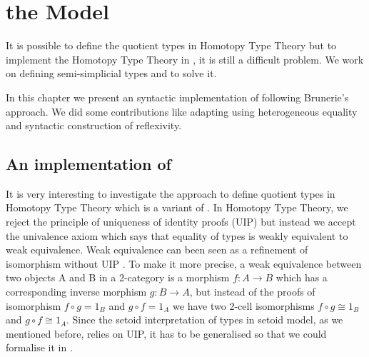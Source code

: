 \chapter{the \og Model}
\label{wog}




It is possible to
define the quotient types in Homotopy Type Theory but to implement the
Homotopy Type Theory in \itt{}, it is still a difficult problem. We
work on defining semi-simplicial types and \wog{} to solve it. 



In this chapter we present an syntactic implementation of \wog{} following
Brunerie's approach. We did some contributions like adapting using
heterogeneous equality and syntactic construction of reflexivity.



\section{An implementation of \wog{}}

It is very interesting to investigate the approach to define quotient
types in Homotopy Type Theory which is a variant of \mltt{}. In
Homotopy Type Theory, we reject
the principle of uniqueness of identity proofs (UIP) but instead we accept the univalence axiom which
says that equality of types is weakly equivalent to weak equivalence. Weak equivalence can been seen as a refinement of isomorphism without UIP \cite{txa:csl}. To make it more precise, a weak equivalence
between two objects A and B in a 2-category is a morphism $f : A \to B$ which has a
corresponding inverse morphism $ g : B \to A$, but instead of the
proofs of isomorphism $f ∘ g = 1_B$ and  $g ∘ f = 1_A$ we have two
2-cell isomorphisms  $f ∘ g ≅ 1_B$ and  $g ∘ f ≅ 1_A$.
Since the setoid interpretation of types in setoid
model, as we mentioned before, relies on UIP, it  has to be
generalised so that we could formalise it in \itt{}.


